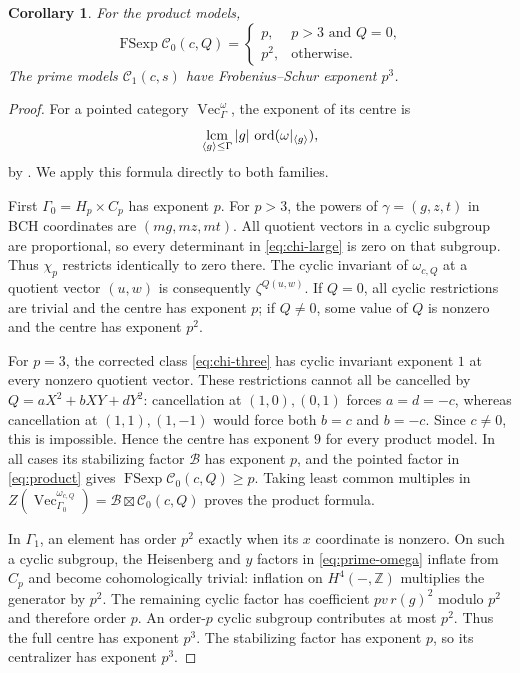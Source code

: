 \documentclass[11pt]{amsart}
\newtheorem{corollary}[theorem]{Corollary}
\theoremstyle{definition}\newtheorem{definition}[theorem]{Definition}
\renewcommand{\Vec}{\operatorname{Vec}}
\newcommand{\cB}{\mathcal B}
\newcommand{\cC}{\mathcal C}
\begin{document}
\begin{corollary}\label{cor:exponent}
For the product models,
\[
\operatorname{FSexp}\cC_0(c,Q)=
\begin{cases}
p,&p>3\text{ and }Q=0,\\
p^2,&\text{otherwise}.
\end{cases}
\]
The prime models $\cC_1(c,s)$ have Frobenius--Schur exponent $p^3$.
\end{corollary}
\begin{proof}
For a pointed category $\Vec_\Gamma^\omega$, the exponent of its centre is
\[
\mathop{\rm lcm}_{\langle g\rangle\leq\Gamma}
|g|\,\operatorname{ord}(\omega|_{\langle g\rangle}),
\]
by \cite[Theorem 9.2]{NS}. We apply this formula directly to both families.

First $\Gamma_0=H_p\times C_p$ has exponent $p$. For $p>3$, the powers of
$\gamma=(g,z,t)$ in BCH coordinates are $(mg,mz,mt)$. All quotient vectors
in a cyclic subgroup are proportional, so every determinant in
\eqref{eq:chi-large} is zero on that subgroup. Thus $\chi_p$ restricts
identically to zero there. The cyclic invariant of $\omega_{c,Q}$ at a
quotient vector $(u,w)$ is consequently $\zeta^{Q(u,w)}$. If $Q=0$, all
cyclic restrictions are trivial and the centre has exponent $p$; if $Q\ne0$,
some value of $Q$ is nonzero and the centre has exponent $p^2$.

For $p=3$, the corrected class \eqref{eq:chi-three} has cyclic invariant
exponent $1$ at every nonzero quotient vector. These restrictions cannot all
be cancelled by $Q=aX^2+bXY+dY^2$: cancellation at $(1,0),(0,1)$ forces
$a=d=-c$, whereas cancellation at $(1,1),(1,-1)$ would force both $b=c$
and $b=-c$. Since $c\ne0$, this is impossible. Hence the centre has exponent
$9$ for every product model. In all cases its stabilizing factor $\cB$
has exponent $p$, and the pointed factor in \eqref{eq:product} gives
$\operatorname{FSexp}\cC_0(c,Q)\ge p$. Taking least common multiples in
$Z(\Vec_{\Gamma_0}^{\omega_{c,Q}})=\cB\boxtimes\cC_0(c,Q)$ proves the
product formula.

In $\Gamma_1$, an element has order $p^2$
exactly when its $x$ coordinate is nonzero. On such a cyclic subgroup,
the Heisenberg and $y$ factors in \eqref{eq:prime-omega} inflate from $C_p$
and become cohomologically trivial: inflation on $H^4(-,\mathbb Z)$
multiplies the generator by $p^2$. The remaining cyclic factor has coefficient
$pv\,r(g)^2$ modulo $p^2$ and therefore order $p$. An order-$p$ cyclic
subgroup contributes at most $p^2$. Thus the full centre has exponent $p^3$.
The stabilizing factor has exponent $p$, so its centralizer has exponent $p^3$.
\end{proof}
\end{document}
